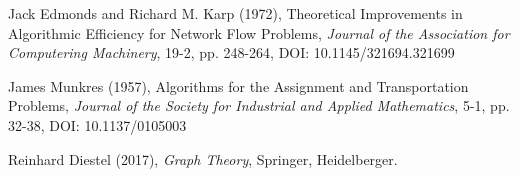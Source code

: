 \documentclass[14pt]{extarticle}
\begin{document}
\begin{thebibliography}{99}
  Jack Edmonds and Richard M. Karp (1972), Theoretical Improvements in Algorithmic Efficiency for Network Flow Problems,
  {\it Journal of the Association for Computering Machinery},
  19-2, pp. 248-264, DOI: 10.1145/321694.321699

  James Munkres (1957), Algorithms for the Assignment and Transportation Problems,
  {\it Journal of the Society for Industrial and Applied Mathematics},
  5-1, pp. 32-38, DOI: 10.1137/0105003

  Reinhard Diestel (2017),
  {\it Graph Theory},
  Springer, Heidelberger.

\end{thebibliography}
\end{document}
